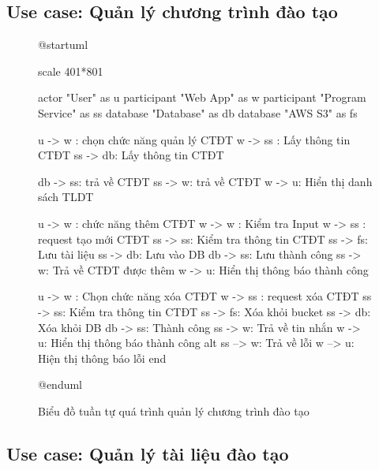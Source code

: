 \documentclass[report.tex]{subfiles}
\begin{document}
\subsection{Use case: Quản lý chương trình đào tạo}

\begin{figure}[!ht]
\caption{Biểu đồ tuần tự quá trình quản lý chương trình đào tạo}
\begin{plantuml}

@startuml

scale 401*801

actor "User" as u
participant "Web App" as w
participant "Program Service" as ss
database "Database" as db
database "AWS S3" as fs

u -> w : chọn chức năng quản lý CTĐT
w -> ss : Lấy thông tin CTĐT
ss -> db: Lấy thông tin CTĐT

db -> ss: trả về CTĐT
ss -> w: trả về CTĐT
w -> u: Hiển thị danh sách TLDT

u -> w : chức năng thêm CTĐT
w -> w : Kiểm tra Input
w -> ss : request tạo mới CTĐT
ss -> ss: Kiểm tra thông tin CTĐT
ss -> fs: Lưu tài liệu
ss -> db: Lưu vào DB
db -> ss: Lưu thành công
ss -> w: Trả về CTĐT được thêm
w -> u: Hiển thị thông báo thành công

u -> w : Chọn chức năng xóa CTĐT
w -> ss : request xóa CTĐT
ss -> ss: Kiểm tra thông tin CTĐT
ss -> fs: Xóa khỏi bucket
ss -> db: Xóa khỏi DB
db -> ss: Thành công
ss -> w: Trả về tin nhắn
w -> u: Hiển thị thông báo thành công
alt
  ss --> w: Trả về lỗi
  w --> u: Hiện thị thông báo lỗi
end

@enduml
\end{plantuml}
\end{figure}
\FloatBarrier

\subsection{Use case: Quản lý tài liệu đào tạo}
\end{document}
